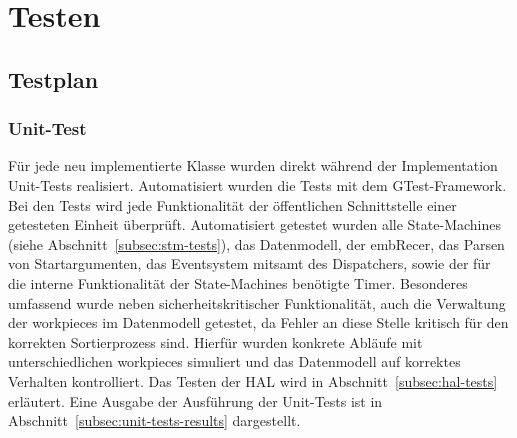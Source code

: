 \chapter{Testen}\label{ch:testen}



\section{Testplan}\label{sec:testplan}




\subsection{Unit-Test}\label{subsec:unit-tests}
Für jede neu implementierte Klasse wurden direkt während der Implementation Unit-Tests realisiert.
Automatisiert wurden die Tests mit dem GTest-Framework.
Bei den Tests wird jede Funktionalität der öffentlichen Schnittstelle einer getesteten Einheit überprüft.
Automatisiert getestet wurden alle State-Machines (siehe Abschnitt~\ref{subsec:stm-tests}), das
Datenmodell, der \gls{embRecer}, das Parsen von Startargumenten,
das Eventsystem mitsamt des Dispatchers, sowie der für die interne Funktionalität der State-Machines benötigte Timer.
Besonderes umfassend wurde neben sicherheitskritischer Funktionalität, auch die Verwaltung der \glspl{workpiece} im Datenmodell getestet,
da Fehler an diese Stelle kritisch für den korrekten Sortierprozess sind.
Hierfür wurden konkrete Abläufe mit unterschiedlichen \glspl{workpiece} simuliert
und das Datenmodell auf korrektes Verhalten kontrolliert.
Das Testen der HAL wird in Abschnitt~\ref{subsec:hal-tests} erläutert.
Eine Ausgabe der Ausführung der Unit-Tests ist in
Abschnitt~\ref{subsec:unit-tests-results} dargestellt.


